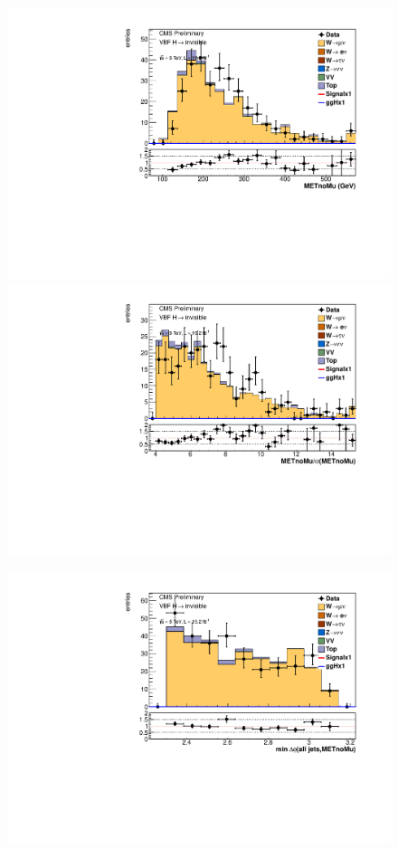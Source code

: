 \begin{figure}
  \includegraphics[width=.6\largefigwidth]{plots/parked/AN-14-243-figs/output_sigreg/munu_metnomuons.pdf}
  \includegraphics[width=.6\largefigwidth]{plots/parked/AN-14-243-figs/output_sigreg/munu_metnomu_significance.pdf}

  \includegraphics[width=.6\largefigwidth]{plots/parked/AN-14-243-figs/output_sigreg/munu_alljetsmetnomu_mindphi.pdf}
  \caption{}%
  \label{fig:parkedwmunu}
\end{figure}

